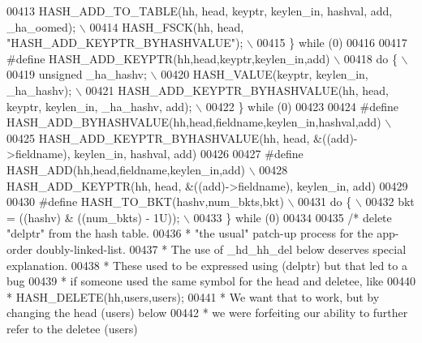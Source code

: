 \begin{DoxyCode}
{{{00413 \textcolor{preprocessor}{  HASH\_ADD\_TO\_TABLE(hh, head, keyptr, keylen\_in, hashval, add, \_ha\_oomed);       \(\backslash\)}
00414 \textcolor{preprocessor}{  HASH\_FSCK(hh, head, "HASH\_ADD\_KEYPTR\_BYHASHVALUE");                            \(\backslash\)}
00415 \textcolor{preprocessor}{\} while (0)}
00416 
00417 \textcolor{preprocessor}{#define HASH\_ADD\_KEYPTR(hh,head,keyptr,keylen\_in,add)                            \(\backslash\)}
00418 \textcolor{preprocessor}{do \{                                                                             \(\backslash\)}
00419 \textcolor{preprocessor}{  unsigned \_ha\_hashv;                                                            \(\backslash\)}
00420 \textcolor{preprocessor}{  HASH\_VALUE(keyptr, keylen\_in, \_ha\_hashv);                                      \(\backslash\)}
00421 \textcolor{preprocessor}{  HASH\_ADD\_KEYPTR\_BYHASHVALUE(hh, head, keyptr, keylen\_in, \_ha\_hashv, add);      \(\backslash\)}
00422 \textcolor{preprocessor}{\} while (0)}
00423 
00424 \textcolor{preprocessor}{#define HASH\_ADD\_BYHASHVALUE(hh,head,fieldname,keylen\_in,hashval,add)            \(\backslash\)}
00425 \textcolor{preprocessor}{  HASH\_ADD\_KEYPTR\_BYHASHVALUE(hh, head, &((add)->fieldname), keylen\_in, hashval, add)}
00426 
00427 \textcolor{preprocessor}{#define HASH\_ADD(hh,head,fieldname,keylen\_in,add)                                \(\backslash\)}
00428 \textcolor{preprocessor}{  HASH\_ADD\_KEYPTR(hh, head, &((add)->fieldname), keylen\_in, add)}
00429 
00430 \textcolor{preprocessor}{#define HASH\_TO\_BKT(hashv,num\_bkts,bkt)                                          \(\backslash\)}
00431 \textcolor{preprocessor}{do \{                                                                             \(\backslash\)}
00432 \textcolor{preprocessor}{  bkt = ((hashv) & ((num\_bkts) - 1U));                                           \(\backslash\)}
00433 \textcolor{preprocessor}{\} while (0)}
00434 
00435 \textcolor{comment}{/* delete "delptr" from the hash table.}
00436 \textcolor{comment}{ * "the usual" patch-up process for the app-order doubly-linked-list.}
00437 \textcolor{comment}{ * The use of \_hd\_hh\_del below deserves special explanation.}
00438 \textcolor{comment}{ * These used to be expressed using (delptr) but that led to a bug}
00439 \textcolor{comment}{ * if someone used the same symbol for the head and deletee, like}
00440 \textcolor{comment}{ *  HASH\_DELETE(hh,users,users);}
00441 \textcolor{comment}{ * We want that to work, but by changing the head (users) below}
00442 \textcolor{comment}{ * we were forfeiting our ability to further refer to the deletee (users)}
}}}
\end{DoxyCode}
